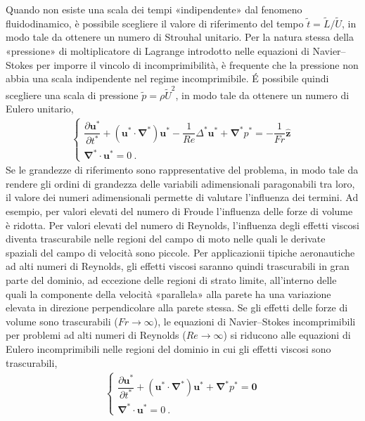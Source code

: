 \documentclass[letterpaper,10pt,italian]{jupyterBook}
\begin{document}
\sphinxAtStartPar
Quando non esiste una scala dei tempi «indipendente» dal fenomeno
fluidodinamico, è possibile scegliere il valore di riferimento del tempo
\(\tilde{t} = \tilde{L} / \tilde{U}\), in modo tale da ottenere un numero
di Strouhal unitario. Per la natura stessa della «pressione» di
moltiplicatore di Lagrange introdotto nelle equazioni di Navier–Stokes
per imporre il vincolo di incomprimibilità, è frequente che la pressione
non abbia una scala indipendente nel regime incomprimibile. É possibile
quindi scegliere una scala di pressione \(\tilde{p} = \rho \tilde{U}^2\),
in modo tale da ottenere un numero di Eulero unitario,
\begin{equation*}
\begin{split}\begin{cases}
 \dfrac{\partial \mathbf{u}^*}{\partial t^*} + (\mathbf{u}^* \cdot \mathbf{\nabla}^*) \mathbf{u}^* - \dfrac{1}{Re} \Delta^* \mathbf{u}^* + \mathbf{\nabla}^* p^* = -\dfrac{1}{Fr} \mathbf{\hat{z}} \\
 \mathbf{\nabla}^* \cdot \mathbf{u}^* = 0 \ .
\end{cases}\end{split}
\end{equation*}
\sphinxAtStartPar
Se le grandezze di riferimento sono rappresentative del
problema, in modo tale da rendere gli ordini di grandezza delle
variabili adimensionali paragonabili tra loro, il valore dei numeri
adimensionali permette di valutare l’influenza dei termini. Ad esempio,
per valori elevati del numero di Froude l’influenza delle forze di
volume è ridotta. Per valori elevati del numero di Reynolds, l’influenza
degli effetti viscosi diventa trascurabile nelle regioni del campo di
moto nelle quali le derivate spaziali del campo di velocità sono
piccole. Per applicazionii tipiche aeronautiche ad alti numeri di
Reynolds, gli effetti viscosi saranno quindi trascurabili in gran parte
del dominio, ad eccezione delle regioni di strato limite, all’interno
delle quali la componente della velocità «parallela» alla parete ha una
variazione elevata in direzione perpendicolare alla parete stessa. Se
gli effetti delle forze di volume sono trascurabili
(\(Fr \rightarrow \infty\)), le equazioni di Navier–Stokes incomprimibili
per problemi ad alti numeri di Reynolds (\(Re \rightarrow \infty\)) si
riducono alle equazioni di Eulero incomprimibili nelle regioni del
dominio in cui gli effetti viscosi sono trascurabili,
\begin{equation*}
\begin{split}\begin{cases}
 \dfrac{\partial \mathbf{u}^*}{\partial t^*} + (\mathbf{u}^* \cdot \mathbf{\nabla}^*) \mathbf{u}^* + \mathbf{\nabla}^* p^* = \mathbf{0} \\
 \mathbf{\nabla}^* \cdot \mathbf{u}^* = 0 \ .
\end{cases}\end{split}
\end{equation*}
\end{document}

